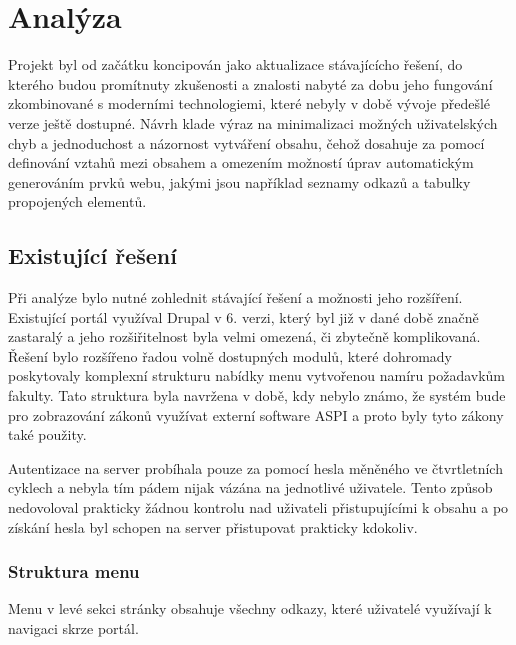 \chapter{Analýza}
\label{chap:analyza}
Projekt byl od začátku koncipován jako aktualizace stávajícícho řešení, do kterého budou promítnuty zkušenosti a znalosti nabyté za dobu jeho fungování zkombinované s moderními technologiemi, které nebyly v době vývoje předešlé verze ještě dostupné. Návrh klade výraz na minimalizaci možných uživatelských chyb a jednoduchost a názornost vytváření obsahu, čehož dosahuje za pomocí definování vztahů mezi obsahem a omezením možností úprav automatickým generováním prvků webu, jakými jsou například seznamy odkazů a tabulky propojených elementů.

\section{Existující řešení}
Při analýze bylo nutné zohlednit stávající řešení a možnosti jeho rozšíření. Existující portál využíval Drupal v 6. verzi, který byl již v dané době značně zastaralý a jeho rozšiřitelnost byla velmi omezená, či zbytečně komplikovaná. Řešení bylo rozšířeno řadou volně dostupných modulů, které dohromady poskytovaly komplexní strukturu nabídky menu vytvořenou namíru požadavkům fakulty. Tato struktura byla navržena v době, kdy nebylo známo, že systém bude pro zobrazování zákonů využívat externí software ASPI a proto byly tyto zákony také použity. 

Autentizace na server probíhala pouze za pomocí hesla měněného ve čtvrtletních cyklech a nebyla tím pádem nijak vázána na jednotlivé uživatele. Tento způsob nedovoloval prakticky žádnou kontrolu nad uživateli přistupujícími k obsahu a po získání hesla byl schopen na server přistupovat prakticky kdokoliv. 

\subsection{Struktura menu}

Menu v levé sekci stránky obsahuje všechny odkazy, které uživatelé využívají k navigaci skrze portál. 

